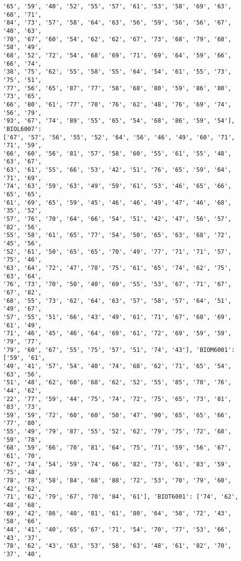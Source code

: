 \documentclass[11pt]{article}
\begin{document}
\begin{Verbatim}[commandchars=\\\{\}]
'65', '59', '40', '52', '55', '57', '61', '53', '58', '69', '63', '60', '71',
'84', '73', '57', '58', '64', '63', '56', '59', '56', '56', '67', '40', '63',
'70', '67', '60', '54', '62', '62', '67', '73', '68', '79', '68', '58', '49',
'68', '52', '72', '54', '68', '69', '71', '69', '64', '59', '66', '66', '74',
'38', '75', '62', '55', '58', '55', '64', '54', '61', '55', '73', '75', '51',
'77', '56', '65', '87', '77', '58', '68', '80', '59', '86', '80', '73', '65',
'66', '80', '61', '77', '70', '76', '62', '48', '76', '69', '74', '56', '79',
'93', '67', '74', '89', '55', '65', '54', '68', '86', '59', '54'], 'BIOL6007':
['67', '57', '56', '55', '52', '64', '56', '46', '49', '60', '71', '71', '59',
'66', '60', '56', '81', '57', '58', '60', '55', '61', '55', '48', '63', '67',
'63', '61', '55', '66', '53', '42', '51', '76', '65', '59', '64', '71', '69',
'74', '63', '59', '63', '49', '59', '61', '53', '46', '65', '66', '65', '65',
'61', '69', '65', '59', '45', '46', '46', '49', '47', '46', '68', '35', '52',
'57', '76', '70', '64', '66', '54', '51', '42', '47', '56', '57', '82', '56',
'55', '58', '61', '65', '77', '54', '50', '65', '63', '68', '72', '45', '56',
'52', '61', '50', '65', '65', '70', '49', '77', '71', '71', '57', '75', '46',
'63', '64', '72', '47', '78', '75', '61', '65', '74', '62', '75', '63', '64',
'76', '73', '70', '50', '40', '69', '55', '53', '67', '71', '67', '67', '82',
'68', '55', '73', '62', '64', '63', '57', '58', '57', '64', '51', '49', '67',
'57', '55', '51', '66', '43', '49', '61', '71', '67', '68', '69', '61', '49',
'71', '46', '45', '46', '64', '69', '61', '72', '69', '59', '59', '79', '77',
'79', '60', '67', '55', '75', '57', '51', '74', '43'], 'BIOM6001': ['59', '61',
'49', '41', '57', '54', '40', '74', '68', '62', '71', '65', '54', '63', '56',
'51', '48', '62', '60', '68', '62', '52', '55', '85', '70', '76', '44', '62',
'22', '77', '59', '44', '75', '74', '72', '75', '65', '73', '81', '83', '73',
'59', '59', '72', '60', '60', '50', '47', '90', '65', '65', '66', '77', '80',
'55', '49', '79', '87', '55', '52', '62', '79', '75', '72', '68', '59', '78',
'68', '59', '66', '70', '81', '64', '75', '71', '59', '56', '67', '61', '70',
'67', '74', '54', '59', '74', '66', '82', '73', '61', '83', '59', '75', '48',
'78', '78', '58', '84', '68', '88', '72', '53', '70', '79', '60', '42', '62',
'71', '62', '79', '67', '70', '84', '61'], 'BIOT6001': ['74', '62', '48', '68',
'69', '42', '86', '40', '81', '61', '80', '64', '58', '72', '43', '58', '66',
'44', '41', '40', '65', '67', '71', '54', '70', '77', '53', '66', '43', '37',
'78', '62', '43', '63', '53', '58', '63', '48', '61', '82', '70', '37', '40',

\end{Verbatim}
\end{document}
